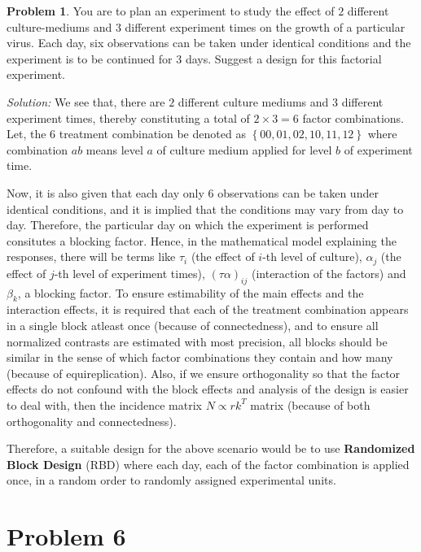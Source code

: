 \documentclass[12pt]{article}
\theoremstyle{definition}
\newtheorem*{prb}{Problem}
\newenvironment{problem}{
\begin{tcolorbox}[colback=blue!5!white,colframe=blue!75!black, parbox = true] \begin{prb}  }{\end{prb}\end{tcolorbox} }
\newenvironment{answer}{\textit{Solution: }\quad }{ \hfill \qedsymbol}
\begin{document}
\begin{problem}
	You are to plan an experiment to study the effect of $2$ different culture-mediums and $3$ different experiment times on the growth of a particular virus. Each day, six observations can be taken under identical conditions and the experiment is to be continued for $3$ days. Suggest a design for this factorial experiment.
\end{problem}

\begin{answer}
	We see that, there are $2$ different culture mediums and $3$ different experiment times, thereby constituting a total of $2 \times 3 = 6$ factor combinations. Let, the $6$ treatment combination be denoted as $\left\{ 00, 01, 02, 10, 11, 12 \right\}$ where combination $ab$ means level $a$ of culture medium applied for level $b$ of experiment time.
	
	Now, it is also given that each day only $6$ observations can be taken under identical conditions, and it is implied that the conditions may vary from day to day. Therefore, the particular day on which the experiment is performed consitutes a blocking factor. Hence, in the mathematical model explaining the responses, there will be terms like $\tau_i$ (the effect of $i$-th level of culture), $\alpha_j$ (the effect of $j$-th level of experiment times), $(\tau\alpha)_{ij}$ (interaction of the factors) and $\beta_k$, a blocking factor. To ensure estimability of the main effects and the interaction effects, it is required that each of the treatment combination appears in a single block atleast once (because of connectedness), and to ensure all normalized contrasts are estimated with most precision, all blocks should be similar in the sense of which factor combinations they contain and how many (because of equireplication). Also, if we ensure orthogonality so that the factor effects do not confound with the block effects and analysis of the design is easier to deal with, then the incidence matrix $N \propto rk^{T}$ matrix (because of both orthogonality and connectedness). 

	Therefore, a suitable design for the above scenario would be to use \textbf{Randomized Block Design} (RBD) where each day, each of the factor combination is applied once, in a random order to randomly assigned experimental units.

\end{answer}

\section{Problem 6}
\end{document}
